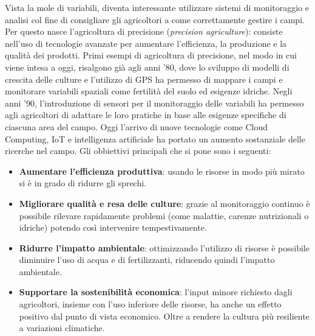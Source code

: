 \documentclass[12pt,a4paper,openright,twoside]{book}
\begin{document}
Vista la mole di variabili, diventa interessante utilizzare sistemi di monitoraggio e analisi col fine di consigliare gli agricoltori a come correttamente gestire i campi. Per questo nasce l'agricoltura di precisione (\textit{precision agriculture}): consiste nell'uso di tecnologie avanzate per aumentare l'efficienza, la produzione e la qualità dei prodotti\cite{ZHANG2002113}.
Primi esempi di agricoltura di precisione, nel modo in cui viene intesa a oggi, risalgono già agli anni '80, dove lo sviluppo di modelli di crescita delle culture e l'utilizzo di \ac{GPS} ha permesso di mappare i campi e monitorare variabili spaziali come fertilità del suolo ed esigenze idriche\cite{201402720190101}.
Negli anni '90, l'introduzione di sensori per il monitoraggio delle variabili ha permesso agli agricoltori di adattare le loro pratiche in base alle esigenze specifiche di ciascuna area del campo\cite{201402720190101}.
Oggi l'arrivo di nuove tecnologie come Cloud Computing, \ac{IoT} e intelligenza artificiale ha portato un aumento sostanziale delle ricerche nel campo\cite{WOLFERT201769}.
Gli obbiettivi principali che si pone sono i seguenti:
\begin{itemize}[noitemsep]
    \item \textbf{Aumentare l'efficienza produttiva}: usando le risorse in modo più mirato si è in grado di ridurre gli sprechi.
    \item \textbf{Migliorare qualità e resa delle culture}: grazie al monitoraggio continuo è possibile rilevare rapidamente problemi (come malattie, carenze nutrizionali o idriche) potendo così intervenire tempestivamente.
    \item \textbf{Ridurre l'impatto ambientale}: ottimizzando l'utilizzo di risorse è possibile diminuire l'uso di acqua e di fertilizzanti, riducendo quindi l'impatto ambientale.
    \item \textbf{Supportare la sostenibilità economica}: l'input minore richiesto dagli agricoltori, insieme con l'uso inferiore delle risorse, ha anche un effetto positivo dal punto di vista economico. Oltre a rendere la cultura più resiliente a variazioni climatiche.
\end{itemize}
\end{document}
